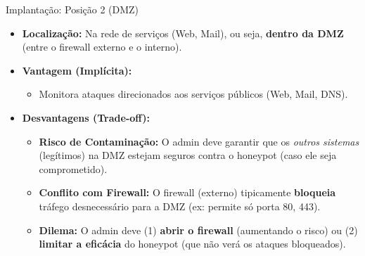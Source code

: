 \begin{frame}{Implantação: Posição 2 (DMZ)}
    \begin{itemize}
        \item \textbf{Localização:} Na rede de serviços (Web, Mail), ou seja, \textbf{dentro da DMZ} (entre o firewall externo e o interno).

        \item \textbf{Vantagem (Implícita):}
              \begin{itemize}
                  \item Monitora ataques direcionados aos serviços públicos (Web, Mail, DNS).
              \end{itemize}

        \item \textbf{Desvantagens (Trade-off):}
              \begin{itemize}
                  \item \textbf{Risco de Contaminação:} O admin deve garantir que os \textit{outros sistemas} (legítimos) na DMZ estejam seguros contra o honeypot (caso ele seja comprometido).
                  \item \textbf{Conflito com Firewall:} O firewall (externo) tipicamente \textbf{bloqueia} tráfego desnecessário para a DMZ (ex: permite só porta 80, 443).
                  \item \textbf{Dilema:} O admin deve (1) \textbf{abrir o firewall} (aumentando o risco) ou (2) \textbf{limitar a eficácia} do honeypot (que não verá os ataques bloqueados).
              \end{itemize}
    \end{itemize}
\end{frame}

